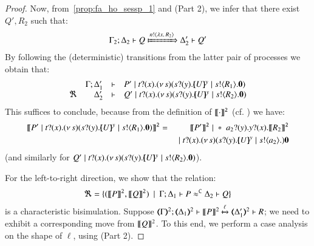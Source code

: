 \begin{proof}
		{}
		{}
		{\fwb}
		{}
		{}
		{}

	\noi Now, from~\eqref{prop:fa_ho_sessp_1} and   (Part 2), we infer that
	there exist $Q', R_2$ such that:
%
	\begin{eqnarray*}
		\Gamma_2; \Delta_2 \proves Q \Hby{\bactout{n}{\abs{x}{R_2}}} \Delta_2' \proves Q'
	\end{eqnarray*}
%
	By following the (deterministic) transitions from the latter pair of processes we obtain that:
%	
%
	$$
	\mhorel	{\Gamma}
		{\Delta_1'}
		{P' \Par \binp{t}{x} \newsp{s}{ \binp{s}{y} \mapchar{U}{y} \Par \bout{s}{R_1} \inact }}
		{\Re}
		{\Delta_2'}
		{}
		{Q' \Par \binp{t}{x} \newsp{s}{ \binp{s}{y} \mapchar{U}{y} \Par \bout{s}{R_2} \inact } }
	$$
	This suffices to conclude, because from the definition of $\llbracket\cdot\rrbracket^\mathtt{2}$ (cf. ) we have:
	\begin{eqnarray*}
		\pmap{P' \Par \binp{t}{x} \newsp{s}{ \binp{s}{y} \mapchar{U}{y} \Par \bout{s}{R_1} \inact}}{2}  & = &
		\pmap{P'}{2} \Par \repl{\binp{a_2}{y} \binp{y}{x} \pmap{R_2}{2}} \\ & & \Par \binp{t}{x} \newsp{s}{ \binp{s}{y} \mapchar{U}{y} \Par \bout{s}{a_2}} \inact
	\end{eqnarray*}
	(and similarly for $Q' \;|\; t ? (x) . (\nu\, s)( s ? (y) . [\!\!(U)\!\!]^{y} \;|\; s ! \langle R_2 \rangle . \mathbf{0} ) $).

\bigskip

	\noi For the left-to-right direction, we show that the relation:
	\[
		\Re = \{ 
		(\llbracket P\rrbracket^\mathtt{2}, \llbracket Q\rrbracket^\mathtt{2})
		\ \ |\ \  \Gamma; \Delta_1 \vdash P \approx^\mathtt{C} \Delta_2 \vdash Q\}
	\]
%
	 is a characteristic bisimulation.
Suppose %
$\stytra{\mapt{\Gamma}^{2}}{\ell}{\mapt{\Delta_1}^{2}}{\map{P}^{2}}{\mapt{\Delta_1'}^{2}}{R}$;
we need to exhibit a corresponding move from $\llbracket Q\rrbracket^{2}$.
To this end, we perform a case analysis on the shape of ${\ell}$, using 
 (Part 2).


\end{proof}
